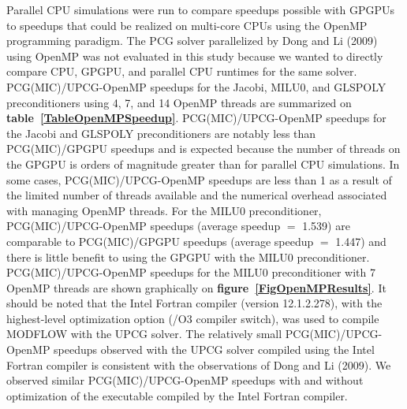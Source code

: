 \documentclass[12pt]{article}
\begin{document}
Parallel CPU simulations were run to compare speedups possible with GPGPUs to speedups that could be realized on multi-core CPUs using the OpenMP programming paradigm. \color{blue} The PCG solver parallelized by Dong and Li (2009) using OpenMP was not evaluated in this study because we wanted to directly compare CPU, GPGPU, and parallel CPU runtimes for the same solver. \color{black}PCG(MIC)/UPCG-OpenMP speedups for the Jacobi, MILU0, and GLSPOLY preconditioners using 4, 7, and 14 OpenMP threads are summarized on \textbf{table~\ref{TableOpenMPSpeedup}}. PCG(MIC)/UPCG-OpenMP speedups for the Jacobi and GLSPOLY preconditioners are notably less than PCG(MIC)/GPGPU speedups and is expected because the number of threads on the GPGPU is orders of magnitude greater than for parallel CPU simulations. \color{cyan} In some cases, PCG(MIC)/UPCG-OpenMP speedups are less than 1 as a result of the limited number of threads available and the numerical overhead associated with managing OpenMP threads. \color{black}For the MILU0 preconditioner, PCG(MIC)/UPCG-OpenMP speedups (average speedup $=$ 1.539) are comparable to PCG(MIC)/GPGPU speedups (average speedup $=$ 1.447) and there is little benefit to using the GPGPU with the MILU0 preconditioner. PCG(MIC)/UPCG-OpenMP speedups for the MILU0 preconditioner with 7 OpenMP threads are shown graphically on \textbf{figure~\ref{FigOpenMPResults}}. It should be noted that the Intel Fortran compiler (version 12.1.2.278), with the highest-level optimization option (/O3 compiler switch), was used to compile MODFLOW with the UPCG solver. The relatively small PCG(MIC)/UPCG-OpenMP speedups observed with the UPCG solver compiled using the Intel Fortran compiler is consistent with the observations of Dong and Li (2009). \color{blue} We observed similar PCG(MIC)/UPCG-OpenMP speedups with and without optimization of the executable compiled by the Intel Fortran compiler.\color{black}
\end{document}
